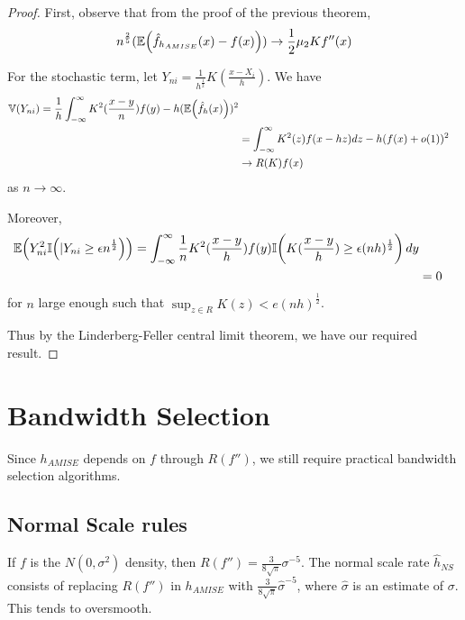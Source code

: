 \begin{proof}
  First, observe that from the proof of the previous theorem,
  \begin{align}
    \label{eq:27}
    n^{\frac{2}{5}} (\E{\hat f_{h_{AMISE}}(x) - f(x)}) \rightarrow
    \frac{1}{2} \mu_{2} K f''(x)
  \end{align}

  For the stochastic term, let $Y_{ni} = \frac{1}{h^{\frac{1}{2}}}
  K(\frac{x - X_{i}}{h})$.  We have
  \begin{align}
    \label{eq:28}
    \Var{Y_{ni}} = \frac{1}{h} \int_{-\infty}^{\infty}
    K^{2}(\frac{x-y}{n}) f(y) - h(\E{\hat f_{h}(x)})^{2} \\
    &= \int_{-\infty}^{\infty} K^{2}(z) f(x - hz) dz - h(f(x) +
    o(1))^{2} \\
    &\rightarrow R(K) f(x)
  \end{align} as $n \rightarrow \infty$.

  Moreover,
  \begin{align}
    \label{eq:29}
    \E{Y^{2}_{ni} \I{|Y_{ni} \geq \epsilon n^{\frac{1}{2}}}} =
    \int_{-\infty}^{\infty} \frac{1}{n} K^{2}(\frac{x - y}{h}) f(y)
    \I{K(\frac{x - y}{h}) \geq \epsilon (nh)^{\frac{1}{2}}} dy \\
    &= 0
  \end{align} for $n$ large enough such that $\sup_{z \in R} K(z) < e
  (nh)^\frac{1}{2}$.

  Thus by the Linderberg-Feller central limit theorem, we have our
  required result.
\end{proof}

\section{Bandwidth Selection}
\label{sec:bandwidth-selection}

Since $h_{AMISE}$ depends on $f$ through $R(f'')$, we still require
practical bandwidth selection algorithms.

\subsection{Normal Scale rules}
\label{sec:normal-scale-rules-1}

If $f$ is the $N(0, \sigma^{2})$ density, then $R(f'') = \frac{3}{8
  \sqrt{\pi}} \sigma^{-5}$.    The normal scale rate $\hat h_{NS}$
consists of replacing $R(f'')$ in $h_{AMISE}$ with $\frac{3}{8
  \sqrt{\pi}} \hat \sigma^{-5}$, where $\hat \sigma$ is an estimate of
$\sigma$.  This tends to oversmooth.


